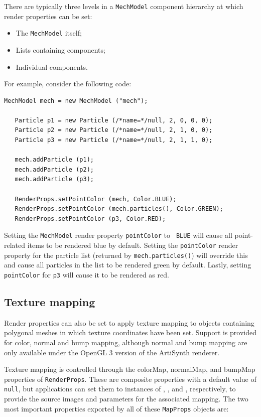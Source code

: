 There are typically three levels in a {\tt MechModel} component
hierarchy at which render properties can be set:

\begin{itemize}

\item The {\tt MechModel} itself;

\item Lists containing components;

\item Individual components.

\end{itemize}

For example, consider the following code:
%
\begin{lstlisting}[]
   MechModel mech = new MechModel ("mech");

   Particle p1 = new Particle (/*name=*/null, 2, 0, 0, 0);
   Particle p2 = new Particle (/*name=*/null, 2, 1, 0, 0);
   Particle p3 = new Particle (/*name=*/null, 2, 1, 1, 0);

   mech.addParticle (p1);
   mech.addParticle (p2);
   mech.addParticle (p3);

   RenderProps.setPointColor (mech, Color.BLUE);
   RenderProps.setPointColor (mech.particles(), Color.GREEN);
   RenderProps.setPointColor (p3, Color.RED);   
\end{lstlisting}
%
Setting the {\tt MechModel} render property {\tt pointColor} to {\tt
BLUE} will cause all point-related items to be rendered blue by
default. Setting the {\tt pointColor} render property for the particle
list (returned by {\tt mech.particles()}) will override this and cause
all particles in the list to be rendered green by default. Lastly,
setting {\tt pointColor} for {\tt p3} will cause it to be rendered as
red.

\subsection{Texture mapping}
\label{TextureMapping:sec}

Render properties can also be set to apply texture mapping to objects
containing polygonal meshes in which texture coordinates have been
set. Support is provided for color, normal and bump mapping,
although normal and bump mapping are only available under the OpenGL 3
version of the ArtiSynth renderer.

Texture mapping is controlled through the {\sf colorMap}, {\sf
normalMap}, and {\sf bumpMap} properties of {\tt RenderProps}.  These
are composite properties with a default value of {\tt null}, but
applications can set them to instances of
,
, and
, respectively, to provide the
source images and parameters for the associated mapping. The two
most important properties exported by all of these
{\tt MapProps} objects are:

